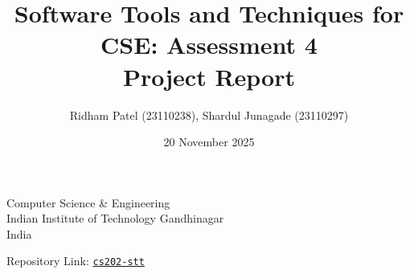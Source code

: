 \documentclass{article}
\title{Software Tools and Techniques for CSE: Assessment 4 \\[1ex] \large Project Report}
\author{Ridham Patel (23110238), Shardul Junagade (23110297)}
\date{20 November 2025}
\begin{document}
\maketitle

\begin{center}
    Computer Science \& Engineering\\
    Indian Institute of Technology Gandhinagar\\
    India


\end{center}

\begin{center}
{\large Repository Link: \href{https://github.com/ShardulJunagade/cs202-stt/}{\texttt{cs202-stt}}}
\end{center}

\tableofcontents
\pagebreak



\newpage



\end{document}
